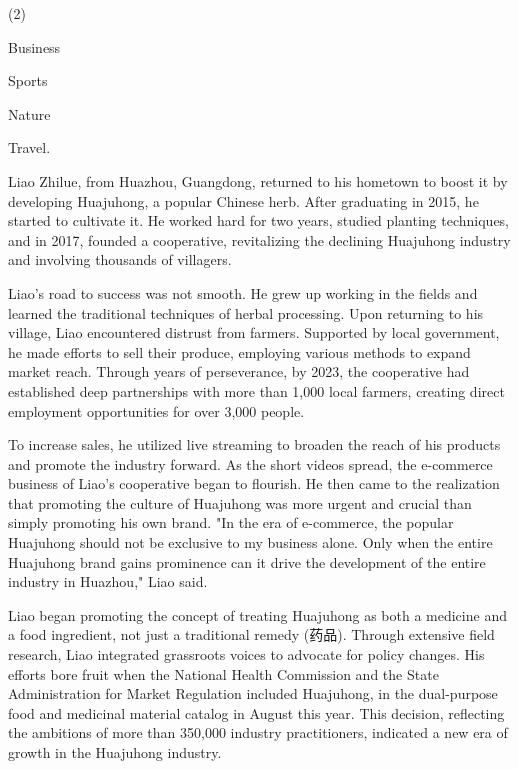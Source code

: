 \documentclass{英语试卷}
\begin{document}
\begin{choices}(2)
  \item Business
  \item Sports
  \item Nature
  \item Travel.
\end{choices}
\par Liao Zhilue, from Huazhou, Guangdong, returned to his hometown to boost it by developing Huajuhong, a popular Chinese herb. After graduating in 2015, he started to cultivate it. He worked hard for two years, studied planting techniques, and in 2017, founded a cooperative, revitalizing the declining Huajuhong industry and involving thousands of villagers.\par
\par Liao's road to success was not smooth. He grew up working in the fields and learned the traditional techniques of herbal processing. Upon returning to his village, Liao encountered distrust from farmers. Supported by local government, he made efforts to sell their produce, employing various methods to expand market reach. Through years of perseverance, by 2023, the cooperative had established deep partnerships with more than 1,000 local farmers, creating direct employment opportunities for over 3,000 people.\par
\par To increase sales, he utilized live streaming to broaden the reach of his products and promote the industry forward. As the short videos spread, the e-commerce business of Liao's cooperative began to flourish. He then came to the realization that promoting the culture of Huajuhong was more urgent and crucial than simply promoting his own brand. "In the era of e-commerce, the popular Huajuhong should not be exclusive to my business alone. Only when the entire Huajuhong brand gains prominence can it drive the development of the entire industry in Huazhou," Liao said.\par
\par Liao began promoting the concept of treating Huajuhong as both a medicine and a food ingredient, not just a traditional remedy (药品). Through extensive field research, Liao integrated grassroots voices to advocate for policy changes. His efforts bore fruit when the National Health Commission and the State Administration for Market Regulation included Huajuhong, in the dual-purpose food and medicinal material catalog in August this year. This decision, reflecting the ambitions of more than 350,000 industry practitioners, indicated a new era of growth in the Huajuhong industry.\par
\end{document}
